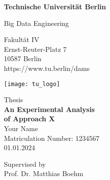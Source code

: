 \thispagestyle{empty}
\begin{center}

\vspace*{1.4cm}
{\LARGE \textbf{Technische Universität Berlin}}

\vspace{0.5cm}

{\large Big Data Engineering\\[1mm]}

Fakultät IV\\
Ernst-Reuter-Platz 7\\
10587 Berlin\\
https://www.tu.berlin/dams\\

\vspace*{1cm}

\texttt{[image: tu\_logo]}

\vspace*{1.0cm}

{\LARGE {} Thesis}\\ %

\vspace{1.0cm}
{\LARGE \textbf{An Experimental Analysis }}\\
\vspace*{0.3cm}
{\LARGE \textbf{of Approach X}}\\
\vspace*{1.0cm}
{\LARGE Your Name}
\\
\vspace*{0.5cm}
Matriculation Number: 1234567\\
01.01.2024\\ %
\vspace*{1.0cm}

Supervised by\\
Prof. Dr. Matthias Boehm \\



\end{center}


